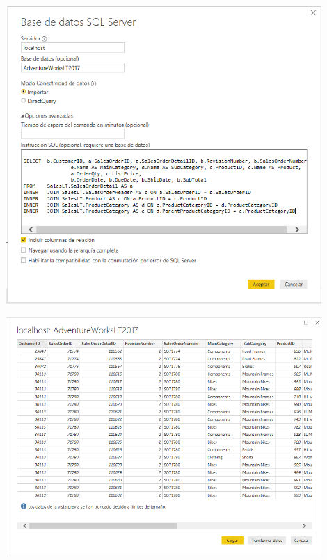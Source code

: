 \begin{center}
\includegraphics[width=12cm]{./Imagenes/img_03} 
\end{center}

\begin{center}
\includegraphics[width=12cm]{./Imagenes/img_04} 
\end{center}
    
